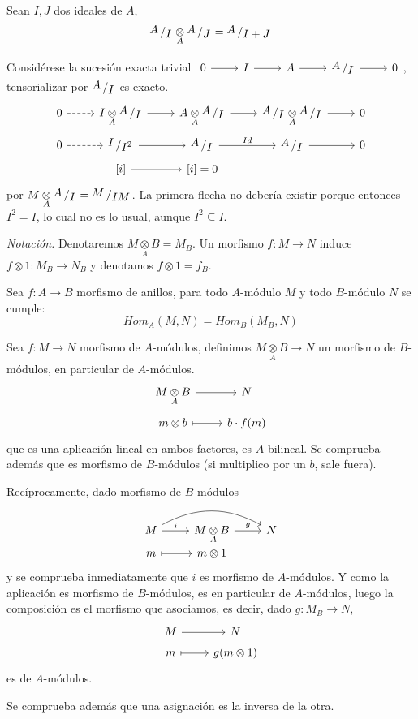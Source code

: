 \begin{ejer}
    Sean $I, J$ dos ideales de $A$, $$\modulo{A}{I}\underset{A}{\otimes} \modulo{A}{J} = \modulo{A}{I+J}$$
\end{ejer}
\begin{ejer}
    Consid\'erese la sucesi\'on exacta trivial $\bt 0\arrow{r} & \arrow{r} I & \arrow{r} A & \arrow{r}\modulo{A}{I} & 0 \et$, tensorializar por $\modulo{A}{I}$ es exacto.
    $$\bt 0 \arrow[dashed]{r} & \arrow{r} I \underset{A}{\otimes} \modulo{A}{I} & \arrow{r} A\underset{A}{\otimes} \modulo{A}{I} & \arrow{r}\modulo{A}{I}\underset{A}{\otimes} \modulo{A}{I} & 0 \\[-5mm]0 \arrow[dashed]{r} &  \arrow{r} \modulo{I}{I^2} & \arrow{r}{Id} \modulo{A}{I} & \arrow{r} \modulo{A}{I} & 0 \\[-5mm] & \left[i\right] \arrow{r} & \left[i\right]=0 \et$$
    por $M \underset{A}{\otimes} \modulo{A}{I} = \modulo{M}{IM}$. La primera flecha no deber\'ia existir porque entonces $I^2 = I$, lo cual no es lo usual, aunque $I^2 \subseteq I$.
\end{ejer}
\noindent \textit{Notaci\'on.}
    Denotaremos $M \underset{A}{\otimes}B = M_B$. Un morfismo $f: M \longrightarrow N$ induce $f\otimes1 : M_B \longrightarrow N_B$ y denotamos $f\otimes1  = f_B$.
\begin{propi}
     Sea $f:A\longrightarrow B$ morfismo de anillos, para todo $A$-m\'odulo $M$ y todo $B$-m\'odulo $N$ se cumple:
    $$Hom_A(M, N) = Hom_B(M_B,N)$$
\end{propi}
\begin{dem}
    Sea $f: M \longrightarrow N$ morfismo de $A$-m\'odulos, definimos $M\underset{A}{\otimes} B \longrightarrow N$ un morfismo de $B$-m\'odulos, en particular de $A$-m\'odulos.
$$\bt M\underset{A}{\otimes} B \arrow{r} &  N \\[-5mm] m \otimes b \arrow[mapsto]{r} & b \cdot f(m) \et$$ que es una aplicaci\'on lineal en ambos factores, es $A$-bilineal. Se comprueba adem\'as que es morfismo de $B$-m\'odulos (si multiplico por un $b$, sale fuera). 

Rec\'iprocamente, dado morfismo de $B$-m\'odulos
    $$\bt M \arrow[bend left=10mm]{rr} \arrow{r}{i}&  M\underset{A}{\otimes} B \arrow{r}{g} &  N \\[-7mm] m \arrow[mapsto]{r} & m \otimes 1  \et$$ 
    y se comprueba inmediatamente que $i$ es morfismo de $A$-m\'odulos. Y como la aplicaci\'on es morfismo de $B$-m\'odulos, es en particular de $A$-m\'odulos, luego la composici\'on es el morfismo que asociamos, es decir, dado 
    $g: M_B \longrightarrow N$, 
    $$\bt M\arrow{r} &  N \\[-5mm] m  \arrow[mapsto]{r} & g(m \otimes 1) \et$$
    es de $A$-m\'odulos. 

    Se comprueba adem\'as que una asignaci\'on es la inversa de la otra. 
\end{dem}
